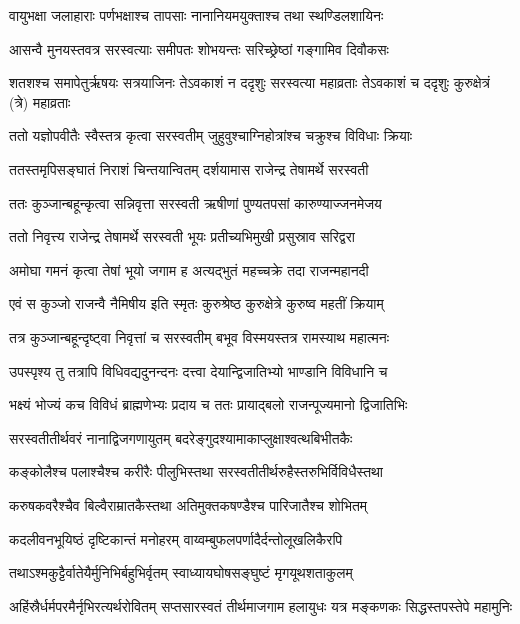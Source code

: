 \twolineshloka
{वायुभक्षा जलाहाराः पर्णभक्षाश्च तापसाः}
{नानानियमयुक्ताश्च तथा स्थण्डिलशायिनः}


\twolineshloka
{आसन्वै मुनयस्तवत्र सरस्वत्याः समीपतः}
{शोभयन्तः सरिच्छ्रेष्ठां गङ्गामिव दिवौकसः}


\threelineshloka
{शतशश्च समापेतुर्ऋषयः सत्रयाजिनः}
{तेऽवकाशं न ददृशुः सरस्वत्या महाव्रताः}
{तेऽवकाशं च ददृशुः कुरुक्षेत्रं (त्रे) महाव्रताः}


\twolineshloka
{ततो यज्ञोपवीतैः स्वैस्तत्र कृत्वा सरस्वतीम्}
{जुहुवुश्चाग्निहोत्रांश्च चक्रुश्च विविधाः क्रियाः}


\twolineshloka
{ततस्तमृपिसङ्घातं निराशं चिन्तयान्वितम्}
{दर्शयामास राजेन्द्र तेषामर्थे सरस्वती}


\twolineshloka
{ततः कुञ्जान्बहून्कृत्वा सन्निवृत्ता सरस्वती}
{ऋषीणां पुण्यतपसां कारुण्याज्जनमेजय}


\twolineshloka
{ततो निवृत्त्य राजेन्द्र तेषामर्थे सरस्वती}
{भूयः प्रतीच्यभिमुखी प्रसुस्राव सरिद्वरा}


\twolineshloka
{अमोघा गमनं कृत्वा तेषां भूयो जगाम ह}
{अत्यद्भुतं महच्चक्रे तदा राजन्महानदी}


\twolineshloka
{एवं स कुञ्जो राजन्वै नैमिषीय इति स्मृतः}
{कुरुश्रेष्ठ कुरुक्षेत्रे कुरुष्व महतीं क्रियाम्}


\twolineshloka
{तत्र कुञ्जान्बहून्दृष्ट्वा निवृत्तां च सरस्वतीम्}
{बभूव विस्मयस्तत्र रामस्याथ महात्मनः}


\twolineshloka
{उपस्पृश्य तु तत्रापि विधिवद्यदुनन्दनः}
{दत्त्वा देयान्द्विजातिभ्यो भाण्डानि विविधानि च}


\twolineshloka
{भक्ष्यं भोज्यं कच विविधं ब्राह्मणेभ्यः प्रदाय च}
{ततः प्रायाद्बलो राजन्पूज्यमानो द्विजातिभिः}


\twolineshloka
{सरस्वतीतीर्थवरं नानाद्विजगणायुतम्}
{बदरेङ्गुदश्यामाकाप्लुक्षाश्वत्थबिभीतकैः}


\twolineshloka
{कङ्कोलैश्च पलाश्चैश्च करीरैः पीलुभिस्तथा}
{सरस्वतीतीर्थरुहैस्तरुभिर्विविधैस्तथा}


\twolineshloka
{करुषकवरैश्चैव बिल्वैराम्रातकैस्तथा}
{अतिमुक्तकषण्डैश्च पारिजातैश्च शोभितम्}


\twolineshloka
{कदलीवनभूयिष्ठं दृष्टिकान्तं मनोहरम्}
{वाय्वम्बुफलपर्णादैर्दन्तोलूखलिकैरपि}


\twolineshloka
{तथाऽश्मकुट्टैर्वातेयैर्मुनिभिर्बहुभिर्वृतम्}
{स्वाध्यायघोषसङ्घुष्टं मृगयूथशताकुलम्}


\threelineshloka
{अहिंस्रैर्धर्मपरमैर्नृभिरत्यर्थरोवितम्}
{सप्तसारस्वतं तीर्थमाजगाम हलायुधः}
{यत्र मङ्कणकः सिद्धस्तपस्तेपे महामुनिः}


